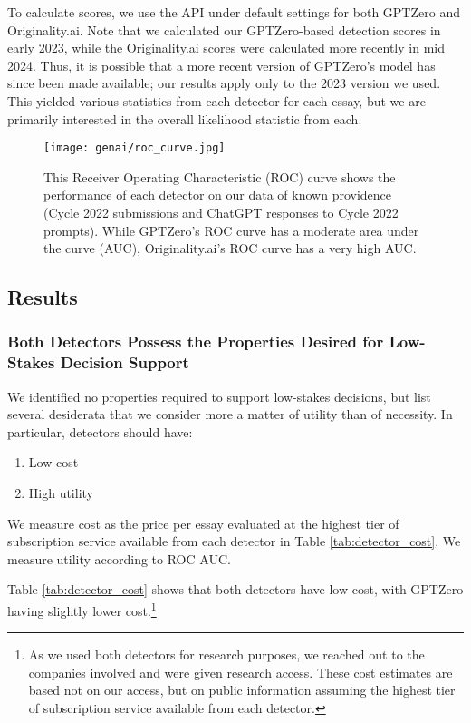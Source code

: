 To calculate scores, we use the API under default settings for both GPTZero and Originality.ai. Note that we calculated our GPTZero-based detection scores in early 2023, while the Originality.ai scores were calculated more recently in mid 2024. Thus, it is possible that a more recent version of GPTZero's model has since been made available; our results apply only to the 2023 version we used. This yielded various statistics from each detector for each essay, but we are primarily interested in the overall likelihood statistic from each.

\begin{figure}[htb]
  \centering
  \texttt{[image: genai/roc\_curve.jpg]}
  \caption{This Receiver Operating Characteristic (ROC) curve shows the performance of each detector on our data of known providence (Cycle 2022 submissions and ChatGPT responses to Cycle 2022 prompts). While GPTZero's ROC curve has a moderate area under the curve (AUC), Originality.ai's ROC curve has a very high AUC.}
  \label{fig:roc_auc}
\end{figure}

\subsection{Results}
\subsubsection{Both Detectors Possess the Properties Desired for Low-Stakes Decision Support}
We identified no properties required to support low-stakes decisions, but list several desiderata that we consider more a matter of utility than of necessity. In particular, detectors should have:

\begin{enumerate}
    \item Low cost
    \item High utility
\end{enumerate}

We measure cost as the price per essay evaluated at the highest tier of subscription service available from each detector in Table \ref{tab:detector_cost}. We measure utility according to ROC AUC.

Table \ref{tab:detector_cost} shows that both detectors have low cost, with GPTZero having slightly lower cost.\footnote{As we used both detectors for research purposes, we reached out to the companies involved and were given research access. These cost estimates are based not on our access, but on public information assuming the highest tier of subscription service available from each detector.}

